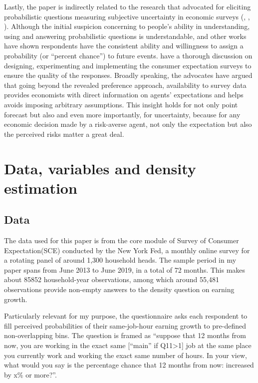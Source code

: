 \documentclass[12pt,notitlepage,onecolumn,aps,pra]{article}
\begin{document}
Lastly, the paper is indirectly related to the research that advocated
for eliciting probabilistic questions measuring subjective uncertainty
in economic surveys (\cite{manski_measuring_2004},
\cite{delavande2011measuring}, \cite{manski_survey_2018}). Although the
initial suspicion concerning to people's ability in understanding, using
and answering probabilistic questions is understandable,
\cite{bertrand_people_2001} and other works have shown respondents have
the consistent ability and willingness to assign a probability (or
``percent chance'') to future events. \cite{armantier_overview_2017}
have a thorough discussion on designing, experimenting and implementing
the consumer expectation surveys to ensure the quality of the responses.
Broadly speaking, the advocates have argued that going beyond the
revealed preference approach, availability to survey data provides
economists with direct information on agents' expectations and helps
avoids imposing arbitrary assumptions. This insight holds for not only
point forecast but also and even more importantly, for uncertainty,
because for any economic decision made by a risk-averse agent, not only
the expectation but also the perceived risks matter a great deal.


    \hypertarget{data-variables-and-density-estimation}{%
\section{Data, variables and density
estimation}\label{data-variables-and-density-estimation}}

\hypertarget{data}{%
\subsection{Data}\label{data}}

The data used for this paper is from the core module of Survey of
Consumer Expectation(SCE) conducted by the New York Fed, a monthly
online survey for a rotating panel of around 1,300 household heads. The
sample period in my paper spans from June 2013 to June 2019, in a total
of 72 months. This makes about 85852 household-year observations, among
which around 55,481 observations provide non-empty answers to the
density question on earning growth.

Particularly relevant for my purpose, the questionnaire asks each
respondent to fill perceived probabilities of their same-job-hour
earning growth to pre-defined non-overlapping bins. The question is
framed as ``suppose that 12 months from now, you are working in the
exact same {[}``main'' if Q11\textgreater{}1{]} job at the same place
you currently work and working the exact same number of hours. In your
view, what would you say is the percentage chance that 12 months from
now: increased by x\% or more?''.
\end{document}

